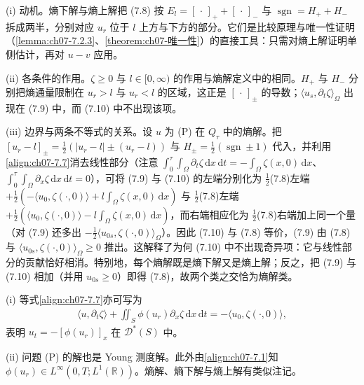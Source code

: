 ﻿\documentclass[../../main.tex]{subfiles}%
\begin{document}
\begin{remark}\label{remark:ch07-上下解动机}
(i) 动机。熵下解与熵上解把 (7.8) 按 $E_l=[\,\cdot\,]_++[\,\cdot\,]_-$ 与 $\operatorname{sgn}=H_++H_-$ 拆成两半，分别对应 $u_r$ 位于 $l$ 上方与下方的部分。它们是比较原理与唯一性证明（\cref{lemma:ch07-7.2.3}、\cref{theorem:ch07-唯一性}）的直接工具：只需对熵上解证明单侧估计，再对 $u-v$ 应用。

(ii) 各条件的作用。$\zeta\geqslant0$ 与 $l\in[0,\infty)$ 的作用与熵解定义中的相同。$H_+$ 与 $H_-$ 分别把熵通量限制在 $u_r>l$ 与 $u_r<l$ 的区域，这正是 $[\,\cdot\,]_\pm$ 的导数；$\langle u_s,\partial_t\zeta\rangle_\Omega$ 出现在 (7.9) 中，而 (7.10) 中不出现该项。

(iii) 边界与两条不等式的关系。设 $u$ 为 (P) 在 $Q_\tau$ 中的熵解。把 $[u_r-l]_\pm=\frac12(|u_r-l|\pm(u_r-l))$ 与 $H_\pm=\frac12(\operatorname{sgn}\pm1)$ 代入，并利用\eqref{align:ch07-7.7}消去线性部分（注意 $\int_0^\tau\int_\Omega\partial_t\zeta\,\mathrm{d}x\,\mathrm{d}t=-\int_\Omega\zeta(x,0)\,\mathrm{d}x$、$\int_0^\tau\int_\Omega\partial_x\zeta\,\mathrm{d}x\,\mathrm{d}t=0$），可将 (7.9) 与 (7.10) 的左端分别化为 $\frac12$(7.8)左端 $+\frac12(-\langle u_0,\zeta(\cdot,0)\rangle+l\int_\Omega\zeta(x,0)\,\mathrm{d}x)$ 与 $\frac12$(7.8)左端 $+\frac12(\langle u_0,\zeta(\cdot,0)\rangle-l\int_\Omega\zeta(x,0)\,\mathrm{d}x)$，而右端相应化为 $\frac12$(7.8)右端加上同一个量（对 (7.9) 还多出 $-\frac12\langle u_{0s},\zeta(\cdot,0)\rangle_\Omega$）。因此 (7.10) 与 (7.8) 等价，(7.9) 由 (7.8) 与 $\langle u_{0s},\zeta(\cdot,0)\rangle_\Omega\geqslant0$ 推出。这解释了为何 (7.10) 中不出现奇异项：它与线性部分的贡献恰好相消。特别地，每个熵解既是熵下解又是熵上解；反之，把 (7.9) 与 (7.10) 相加（并用 $u_{0s}\geqslant0$）即得 (7.8)，故两个类之交恰为熵解类。
\end{remark}

\begin{remark}\label{remark:ch07-7.1.3}
(i) 等式\eqref{align:ch07-7.7}亦可写为
\begin{align*}
\langle u,\partial_t\zeta\rangle+\iint_S\phi(u_r)\partial_x\zeta\,\mathrm{d}x\,\mathrm{d}t=-\langle u_0,\zeta(\cdot,0)\rangle,
\end{align*}
表明 $u_t=-[\phi(u_r)]_x$ 在 $\mathcal{D}^*(S)$ 中。

(ii) 问题 (P) 的解也是 Young 测度解。此外由\eqref{align:ch07-7.1}知 $\phi(u_r)\in L^\infty(0,T;L^1(\mathbb{R}))$。熵解、熵下解与熵上解有类似注记。
\end{remark}
\end{document}
